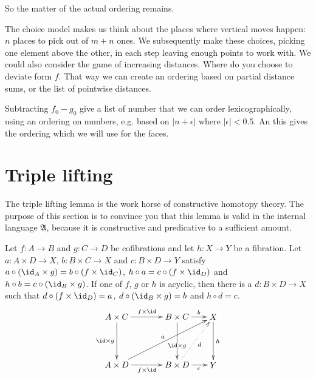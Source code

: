 \documentclass{tac}
\newcommand\of{:}
\newcommand\ambient{\mathfrak A}
\begin{document}
So the matter of the actual ordering remains.

The choice model makes us think about the places where vertical moves happen: $n$ places to pick out of $m+n$ ones.
We subsequently make these choices, picking one element above the other, in each step leaving enough points to work with.
We could also consider the game of increasing distances. Where do you choose to deviate form $f$.
That way we can create an ordering based on partial distance sums, or the list of pointwise distances.

Subtracting $f_0-g_0$ give a list of number that we can order lexicographically, using an ordering on numbers, e.g. based on $|n+\epsilon|$ where $|\epsilon|<0.5$.
An this gives the ordering which we will use for the faces.


\section{Triple lifting}
The triple lifting lemma is the work horse of constructive homotopy theory. The purpose of this section is to convince you that this lemma is valid in the internal language $\ambient$, because it is constructive and predicative to a sufficient amount.

\begin{lemma} Let $f\of A\to B$ and $g\of C\to D$ be cofibrations and let $h\of X\to Y$ be a fibration. Let $a\of A\times D\to X$, $b\of B\times C\to X$ and $c\of B \times D\to Y$ satisfy $a\circ(\id_A\times g) = b\circ(f\times \id_C)$, $h\circ a=c\circ(f\times \id_D)$ and $h\circ b=c\circ(\id_B\times g)$. If one of $f$, $g$ or $h$ is acyclic, then there is a $d\of B\times D\to X$ such that $d\circ(f\times\id_D)=a$, $d\circ(\id_B\times g)=b$ and $h\circ d = c$.
\[\xy
(0,20)*+{A\times C}="AC",(25,20)*+{B\times C}="BC",(40,20)*+{X}="X",
(0,0)*+{A\times D}="AD",(25,0)*+{B\times D}="BD",(40,0)*+{Y}="Y"
\ar^{f\times\id} "AC";"BC"
\ar_{\id\times g} "AC";"AD"
\ar_{f\times\id} "AD";"BD"
\ar^{a} "AD";"X"
\ar|(.6){\id\times g} "BC";"BD"
\ar^(.6){b} "BC";"X"
\ar@{.>}_{d} "BD";"X"
\ar_(.6){c} "BD";"Y"
\ar^{h} "X";"Y"
\endxy\]
\label{triple lift}
\end{lemma}
\end{document}
